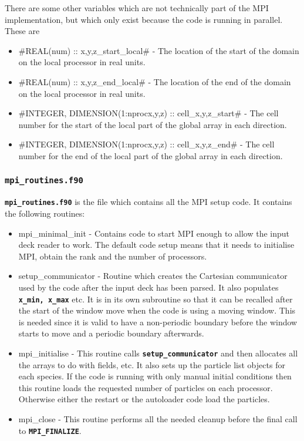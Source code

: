 \documentclass[12pt,a4paper]{article}
\newcommand{\inlinecode}[1]{{\color{warwickred} \bf\texttt{#1}}}
\newcommand{\EPOCH}{{\color{warwickdark}\fontfamily{phv}\selectfont{EPOCH}}}
\begin{document}
There are some other variables which are not technically part of the MPI
implementation, but which only exist because the code is running in
parallel. These are
\begin{itemize}
\item #REAL(num) :: {x,y,z}_start_local# - The location of the start of the
  domain on the local processor in real units.
\item #REAL(num) :: {x,y,z}_end_local# - The location of the end of the
  domain on the local processor in real units.
\item #INTEGER, DIMENSION(1:nproc{x,y,z}) :: cell_{x,y,z}_start# - The cell
  number for the start of the local part of the global array in each direction.
\item #INTEGER, DIMENSION(1:nproc{x,y,z}) :: cell_{x,y,z}_end#
  - The cell number for the end of the local part of the global array in each
  direction.
\end{itemize}

\subsubsection{\inlinecode{mpi\_routines.f90}}
\inlinecode{mpi\_routines.f90} is the file which contains all the MPI setup
code. It contains the following routines:
\begin{itemize}
\item mpi\_minimal\_init - Contains code to start MPI enough to
  allow the input deck reader to work. The default {\EPOCH} code setup means
  that it needs to initialise MPI, obtain the rank and the number of processors.
\item setup\_communicator - Routine which creates the Cartesian communicator
  used by the code after the input deck has been parsed. It also populates
  \inlinecode{x\_min, x\_max} etc. It is in its own subroutine so that it can be
  recalled after the start of the window move when the code is using a moving
  window. This is needed since it is valid to have a non-periodic boundary
  before the window starts to move and a periodic boundary afterwards.
\item mpi\_initialise - This routine calls \inlinecode{setup\_communicator} and
  then allocates all the arrays to do with fields, etc. It also sets up the
  particle list objects for each species. If the code is running with only
  manual initial conditions then this routine loads the requested number of
  particles on each processor. Otherwise either the restart or the autoloader
  code load the particles.
\item mpi\_close - This routine performs all the needed cleanup before the
  final call to \inlinecode{MPI\_FINALIZE}.
\end{itemize}
\end{document}

